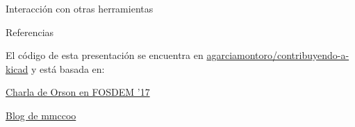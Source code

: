
\begin{frame}{Interacción con otras herramientas}
\begin{center}
	\begin{minipage}{0.8\textwidth}
	\end{minipage}
\end{center}
\end{frame}

\begin{frame}{Referencias}
	\begin{center}
	\begin{minipage}{0.8\textwidth}
		El código de esta presentación se encuentra en \faGithub\href{https://github.com/agarciamontoro/contribuyendo-a-kicad}{agarciamontoro/contribuyendo-a-kicad} y está basada en: \\
	\end{minipage}
	\begin{minipage}{0.7\textwidth}
		\begin{fullpageitemize}
			\pause
			\item[\faComments] \href{https://fosdem.org/2017/schedule/event/kicad_source/attachments/slides/1696/export/events/attachments/kicad_source/slides/1696/kicad_source.pdf}{Charla de Orson en FOSDEM '17} \\
			\pause
			\item[\faWordpress] \href{https://kicad.mmccoo.com/}{Blog de mmccoo} \\
		\end{fullpageitemize}
	\end{minipage}
\end{center}
\end{frame}